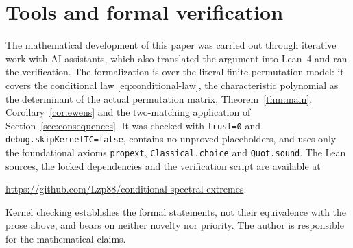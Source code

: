 \documentclass[11pt]{article}
\theoremstyle{definition}\newtheorem{definition}[theorem]{Definition}
\theoremstyle{remark}\newtheorem{remark}[theorem]{Remark}
\numberwithin{equation}{section}\allowdisplaybreaks
\begin{document}
\section*{Tools and formal verification}
The mathematical development of this paper was carried out through
iterative work with AI assistants, which also translated the argument
into Lean~4 and ran the verification. The formalization is over the
literal finite permutation model: it covers the conditional law
\eqref{eq:conditional-law}, the characteristic polynomial as the
determinant of the actual permutation matrix, Theorem~\ref{thm:main},
Corollary~\ref{cor:ewens} and the two-matching application of
Section~\ref{sec:consequences}. It was checked with \texttt{trust=0} and
\texttt{debug.skipKernelTC=false}, contains no unproved placeholders,
and uses only the foundational axioms \texttt{propext},
\texttt{Classical.choice} and \texttt{Quot.sound}. The Lean sources, the
locked dependencies and the verification script are available at
\begin{center}
\url{https://github.com/Lzp88/conditional-spectral-extremes}.
\end{center}
Kernel checking establishes the formal statements, not their equivalence
with the prose above, and bears on neither novelty nor priority. The
author is responsible for the mathematical claims.
\end{document}

